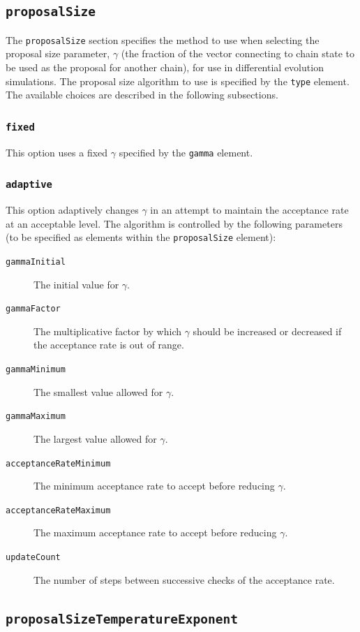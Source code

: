\subsection{{\tt proposalSize}}

The {\tt proposalSize} section specifies the method to use when selecting the proposal size parameter, $\gamma$ (the fraction of the vector connecting to chain state to be used as the proposal for another chain), for use in differential evolution simulations. The proposal size algorithm to use is specified by the {\tt type} element. The available choices are described in the following subsections.

\subsubsection{{\tt fixed}}

This option uses a fixed $\gamma$ specified by the {\tt gamma} element.

\subsubsection{{\tt adaptive}}

This option adaptively changes $\gamma$ in an attempt to maintain the acceptance rate at an acceptable level. The algorithm is controlled by the following parameters (to be specified as elements within the {\tt proposalSize} element):
\begin{description}
\item[{\tt gammaInitial}] The initial value for $\gamma$.
\item[{\tt gammaFactor}] The multiplicative factor by which $\gamma$ should be increased or decreased if the acceptance rate is out of range.
\item[{\tt gammaMinimum}] The smallest value allowed for $\gamma$.
\item[{\tt gammaMaximum}] The largest value allowed for $\gamma$.
\item[{\tt acceptanceRateMinimum}] The minimum acceptance rate to accept before reducing $\gamma$.
\item[{\tt acceptanceRateMaximum}] The maximum acceptance rate to accept before reducing $\gamma$.
\item[{\tt updateCount}] The number of steps between successive checks of the acceptance rate.
\end{description}

\subsection{{\tt proposalSizeTemperatureExponent}}

